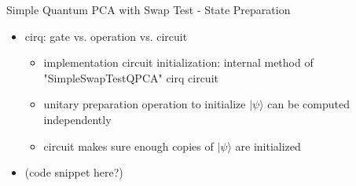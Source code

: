 \begin{frame}{Simple Quantum PCA with Swap Test - State Preparation}
  \begin{minipage}{0.5\textwidth}
    \begin{itemize}
      \item cirq: gate vs. operation vs. circuit
      \begin{itemize}
        \item implementation circuit initialization: internal method of "SimpleSwapTestQPCA" cirq circuit
        \item unitary preparation operation to initialize $|\psi\rangle$ can be computed independently
        \item circuit makes sure enough copies of $|\psi\rangle$ are initialized
      \end{itemize}
    \end{itemize}
  \end{minipage}%
  \begin{minipage}{0.5\textwidth}
    \begin{itemize}
      \item (code snippet here?)
    \end{itemize}
  \end{minipage}
\end{frame}


